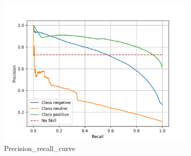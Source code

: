 \documentclass{article}%
\begin{document}
{%
\newpage%
\raggedright%


\begin{figure}[h!]%
\centering%
\includegraphics[width=365px]{./report/Learning/Random_Forest/Recall-Precision.png}%
\caption{Precision\_recall\_curve}%
\end{figure}

%
}%
\pagestyle{firstpage}%
\newpage%
\end{document}
